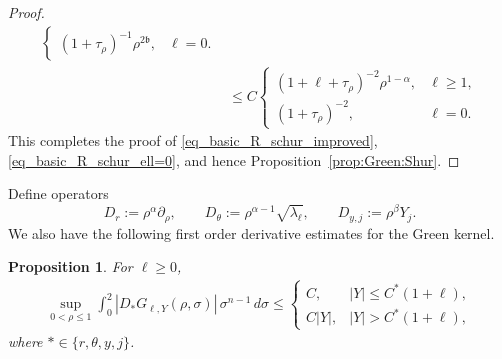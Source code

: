 \documentclass[12pt]{amsart}
\newtheorem{proposition}[theorem]{Proposition}
\begin{document}
\begin{proof}
\begin{align*}
\begin{cases}
        (1+\tau_\rho)^{-1} \rho^{2\mathfrak b}, & \ell=0.
    \end{cases} \\
    &\le C \begin{cases}
        (1+\ell+\tau_\rho)^{-2} \rho^{1-\alpha}, & \ell \ge 1,\\
        (1+\tau_\rho)^{-2}, & \ell=0.
    \end{cases} 
\end{align*}
This completes the proof of \eqref{eq_basic_R_schur_improved}, \eqref{eq_basic_R_schur_ell=0}, and hence Proposition~\ref{prop:Green:Shur}.

\end{proof}








Define operators
\begin{equation*}
    D_r:=\rho^\alpha\partial_\rho,
    \qquad
    D_\theta:=\rho^{\alpha-1}\sqrt{\lambda_\ell},
    \qquad
    D_{y,j}:=\rho^\beta Y_j.
\end{equation*}
We also have the following first order derivative estimates for the Green kernel.








\begin{proposition}\label{lem_basic_D_R_schur_explicit}
For $\ell \ge 0$,
\begin{align}\label{eq_basic_D_R_schur}
    \sup_{0<\rho\leq1} \int_0^2 |D_* G_{\ell,Y}(\rho,\sigma)|\,\sigma^{n-1}\,d\sigma \le \begin{cases}
        C, & |Y|\le C^*(1+\ell),\\[4pt]
        C|Y|, & |Y|>C^*(1+\ell),
    \end{cases}
\end{align}
where $* \in \{r, \theta, y,j\}$.
\end{proposition}
\end{document}
